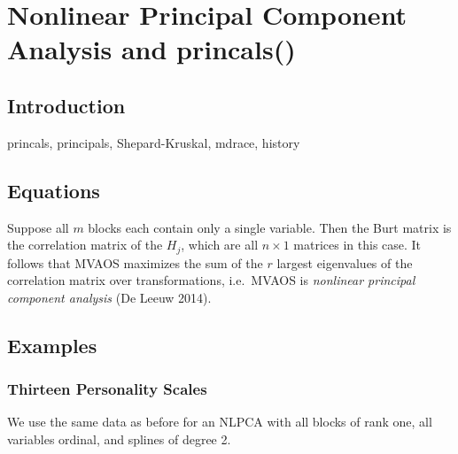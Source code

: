 \documentclass[
  12pt,
  letterpaper,
  DIV=11,
  numbers=noendperiod]{scrreprt}
\begin{document}

\chapter{Nonlinear Principal Component Analysis and
princals()}\label{nonlinear-principal-component-analysis-and-princals}

\section{Introduction}\label{introduction-4}

princals, principals, Shepard-Kruskal, mdrace, history

\section{Equations}\label{equations-3}

Suppose all \(m\) blocks each contain only a single variable. Then the
Burt matrix is the correlation matrix of the \(H_j\), which are all
\(n\times 1\) matrices in this case. It follows that MVAOS maximizes the
sum of the \(r\) largest eigenvalues of the correlation matrix over
transformations, i.e.~MVAOS is \emph{nonlinear principal component
analysis} (De Leeuw 2014).

\section{Examples}\label{examples-3}

\subsection{Thirteen Personality
Scales}\label{thirteen-personality-scales-1}

We use the same data as before for an NLPCA with all blocks of rank one,
all variables ordinal, and splines of degree 2.
\end{document}

